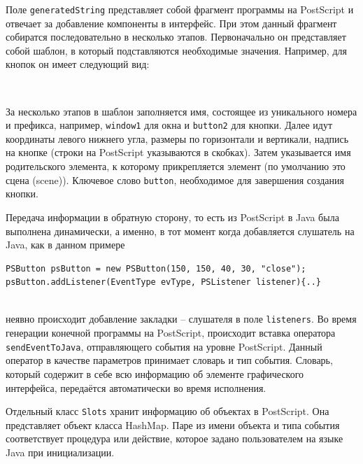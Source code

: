\documentclass[14pt]{matmex-diploma}
\begin{document}
Поле \texttt{generatedString} представляет собой фрагмент программы на PostScript и отвечает за добавление компоненты в интерфейс. При этом данный фрагмент собиратся последовательно в несколько этапов. Первоначально он представляет собой шаблон, в который подставляются необходимые значения. Например, для кнопок он имеет следующий вид:\\

\lstset{language=Java,basicstyle=\footnotesize\ttfamily} 
\begin{lstlisting}[frame=single]
%s %d %d %d %d (%s) scene events button
\end{lstlisting}\\

За несколько этапов в шаблон заполняется имя, состоящее из уникального номера и префикса, например, \texttt{window1} для окна и \texttt{button2} для кнопки. Далее идут координаты левого нижнего угла, размеры по горизонтали и вертикали, надпись на кнопке (строки на PostScript указываются в скобках). Затем указывается имя родительского элемента, к которому прикрепляется элемент (по умолчанию это сцена (scene)). Ключевое слово \texttt{button}, необходимое для завершения создания кнопки.

Передача информации в обратную сторону, то есть из PostScript в Java была выполнена динамически, а именно, в тот момент когда добавляется слушатель на Java, как в данном примере \\


\lstset{language=Java,basicstyle=\footnotesize\ttfamily} 
\begin{lstlisting}[frame=single]
PSButton psButton = new PSButton(150, 150, 40, 30, "close");
psButton.addListener(EventType evType, PSListener listener){..}
\end{lstlisting}\\

неявно происходит добавление закладки -- слушателя в поле \texttt{listeners}. Во время генерации конечной программы на PostScript, происходит вставка оператора \texttt{sendEventToJava}, отправляющего события на уровне PostScript. Данный оператор в качестве параметров принимает словарь и тип события. Словарь, который содержит в себе всю информацию об элементе графического интерфейса, передаётся автоматически во время исполнения.

Отдельный класс \texttt{Slots} хранит информацию об объектах в PostScript. Она представляет объект класса HashMap. Паре из имени объекта и типа события соответствует процедура или действие, которое задано пользователем на языке Java при инициализации. 
\end{document}
